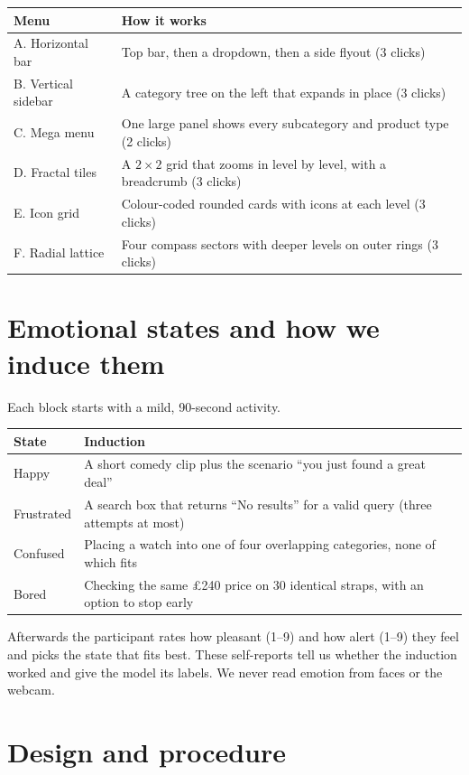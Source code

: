 \documentclass[10pt,a4paper]{article}
\begin{document}
\begin{tabularx}{\linewidth}{@{}lX@{}}
\toprule
Menu & How it works \\
\midrule
A. Horizontal bar & Top bar, then a dropdown, then a side flyout (3 clicks) \\
B. Vertical sidebar & A category tree on the left that expands in place (3 clicks) \\
C. Mega menu & One large panel shows every subcategory and product type (2 clicks) \\
D. Fractal tiles & A $2\times2$ grid that zooms in level by level, with a breadcrumb (3 clicks) \\
E. Icon grid & Colour-coded rounded cards with icons at each level (3 clicks) \\
F. Radial lattice & Four compass sectors with deeper levels on outer rings (3 clicks) \\
\bottomrule
\end{tabularx}

\section{Emotional states and how we induce them}

Each block starts with a mild, 90-second activity.

\begin{tabularx}{\linewidth}{@{}lX@{}}
\toprule
State & Induction \\
\midrule
Happy & A short comedy clip plus the scenario ``you just found a great deal'' \\
Frustrated & A search box that returns ``No results'' for a valid query (three attempts at most) \\
Confused & Placing a watch into one of four overlapping categories, none of which fits \\
Bored & Checking the same \pounds240 price on 30 identical straps, with an option to stop early \\
\bottomrule
\end{tabularx}

Afterwards the participant rates how pleasant (1--9) and how alert (1--9) they feel and picks
the state that fits best. These self-reports tell us whether the induction worked and give
the model its labels. We never read emotion from faces or the webcam.

\section{Design and procedure}
\end{document}
